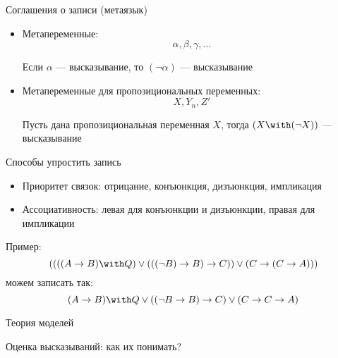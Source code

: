 \documentclass[aspectratio=169]{beamer}
\begin{document}
\begin{frame}{Соглашения о записи (метаязык)}
\begin{itemize}
\item Метапеременные:
$$\alpha, \beta, \gamma, \dots$$\pause

Если $\alpha$ --- высказывание, то $(\neg\alpha)$ --- высказывание\pause\vspace{0.3cm}

\item Метапеременные для пропозициональных переменных:
$$X, Y_{n}, Z'$$\pause

Пусть дана пропозициональная переменная $X$, тогда $(X\with(\neg X))$ --- высказывание
\end{itemize}

\end{frame}

\begin{frame}{Способы упростить запись}
\begin{itemize}
\item Приоритет связок: отрицание, конъюнкция, дизъюнкция, импликация \pause
\item Ассоциативность: левая для конъюнкции и дизъюнкции, правая для импликации \pause
\end{itemize}
Пример:
$$((((A\rightarrow B)\with Q)\vee(((\neg B)\rightarrow B) \rightarrow C)) \vee (C \rightarrow (C\rightarrow A)))$$
можем записать так:
$$(A\rightarrow B)\with Q\vee((\neg B\rightarrow B) \rightarrow C) \vee (C \rightarrow C\rightarrow A)$$
\end{frame}

\begin{frame}{Теория моделей}

Оценка высказываний: как их понимать?


\end{frame}
\end{document}
